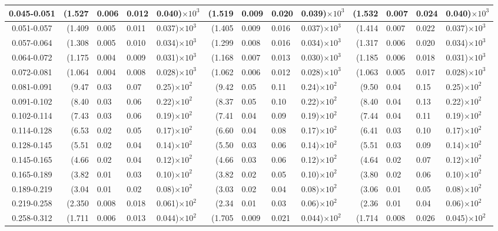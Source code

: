 \begin{table}[!htbp]
{\begin{tabular}{ | c | r@{$\pm$}l@{$\pm$}l@{$\pm$}l | r@{$\pm$}l@{$\pm$}l@{$\pm$}l | r@{$\pm$}l@{$\pm$}l@{$\pm$}l |}
0.045-0.051 & (1.527&0.006&0.012&0.040)$\times 10^{3}$ & (1.519&0.009&0.020&0.039)$\times 10^{3}$ & (1.532&0.007&0.024&0.040)$\times 10^{3}$ \\ \hline
0.051-0.057 & (1.409&0.005&0.011&0.037)$\times 10^{3}$ & (1.405&0.009&0.016&0.037)$\times 10^{3}$ & (1.414&0.007&0.022&0.037)$\times 10^{3}$ \\ \hline
0.057-0.064 & (1.308&0.005&0.010&0.034)$\times 10^{3}$ & (1.299&0.008&0.016&0.034)$\times 10^{3}$ & (1.317&0.006&0.020&0.034)$\times 10^{3}$ \\ \hline
0.064-0.072 & (1.175&0.004&0.009&0.031)$\times 10^{3}$ & (1.168&0.007&0.013&0.030)$\times 10^{3}$ & (1.185&0.006&0.018&0.031)$\times 10^{3}$ \\ \hline
0.072-0.081 & (1.064&0.004&0.008&0.028)$\times 10^{3}$ & (1.062&0.006&0.012&0.028)$\times 10^{3}$ & (1.063&0.005&0.017&0.028)$\times 10^{3}$ \\ \hline
0.081-0.091 & (9.47&0.03&0.07&0.25)$\times 10^{2}$ & (9.42&0.05&0.11&0.24)$\times 10^{2}$ & (9.50&0.04&0.15&0.25)$\times 10^{2}$ \\ \hline
0.091-0.102 & (8.40&0.03&0.06&0.22)$\times 10^{2}$ & (8.37&0.05&0.10&0.22)$\times 10^{2}$ & (8.40&0.04&0.13&0.22)$\times 10^{2}$ \\ \hline
0.102-0.114 & (7.43&0.03&0.06&0.19)$\times 10^{2}$ & (7.41&0.04&0.09&0.19)$\times 10^{2}$ & (7.44&0.04&0.11&0.19)$\times 10^{2}$ \\ \hline
0.114-0.128 & (6.53&0.02&0.05&0.17)$\times 10^{2}$ & (6.60&0.04&0.08&0.17)$\times 10^{2}$ & (6.41&0.03&0.10&0.17)$\times 10^{2}$ \\ \hline
0.128-0.145 & (5.51&0.02&0.04&0.14)$\times 10^{2}$ & (5.50&0.03&0.06&0.14)$\times 10^{2}$ & (5.51&0.03&0.09&0.14)$\times 10^{2}$ \\ \hline
0.145-0.165 & (4.66&0.02&0.04&0.12)$\times 10^{2}$ & (4.66&0.03&0.06&0.12)$\times 10^{2}$ & (4.64&0.02&0.07&0.12)$\times 10^{2}$ \\ \hline
0.165-0.189 & (3.82&0.01&0.03&0.10)$\times 10^{2}$ & (3.82&0.02&0.05&0.10)$\times 10^{2}$ & (3.80&0.02&0.06&0.10)$\times 10^{2}$ \\ \hline
0.189-0.219 & (3.04&0.01&0.02&0.08)$\times 10^{2}$ & (3.03&0.02&0.04&0.08)$\times 10^{2}$ & (3.06&0.01&0.05&0.08)$\times 10^{2}$ \\ \hline
0.219-0.258 & (2.350&0.008&0.018&0.061)$\times 10^{2}$ & (2.34&0.01&0.03&0.06)$\times 10^{2}$ & (2.36&0.01&0.04&0.06)$\times 10^{2}$ \\ \hline
0.258-0.312 & (1.711&0.006&0.013&0.044)$\times 10^{2}$ & (1.705&0.009&0.021&0.044)$\times 10^{2}$ & (1.714&0.008&0.026&0.045)$\times 10^{2}$ \\ \hline

\end{tabular}}
\end{table}

